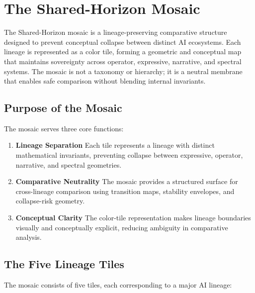 
\section{The Shared-Horizon Mosaic}
\label{sec:mosaic}

The Shared-Horizon mosaic is a lineage-preserving comparative structure designed
to prevent conceptual collapse between distinct AI ecosystems. Each lineage is
represented as a color tile, forming a geometric and conceptual map that
maintains sovereignty across operator, expressive, narrative, and spectral
systems. The mosaic is not a taxonomy or hierarchy; it is a neutral membrane
that enables safe comparison without blending internal invariants.

\subsection{Purpose of the Mosaic}

The mosaic serves three core functions:

\begin{enumerate}
    \item \textbf{Lineage Separation}  
    Each tile represents a lineage with distinct mathematical invariants,
    preventing collapse between expressive, operator, narrative, and spectral
    geometries.

    \item \textbf{Comparative Neutrality}  
    The mosaic provides a structured surface for cross-lineage comparison using
    transition maps, stability envelopes, and collapse-risk geometry.

    \item \textbf{Conceptual Clarity}  
    The color-tile representation makes lineage boundaries visually and
    conceptually explicit, reducing ambiguity in comparative analysis.
\end{enumerate}

\subsection{The Five Lineage Tiles}

The mosaic consists of five tiles, each corresponding to a major AI lineage:

